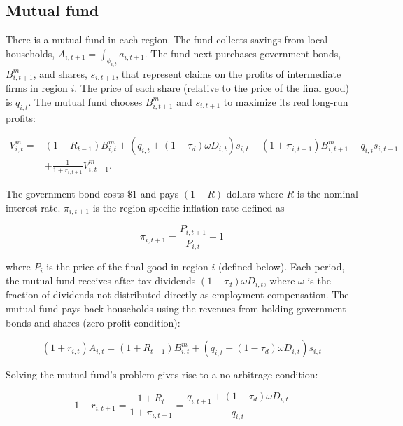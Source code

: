 \documentclass[\latexroot/\projectname]{subfiles}
\begin{document}
\subsection{Mutual fund}
There is a mutual fund in each region. The fund collects savings from local households, $A_{i, t+1}= \int_{\phi_{i, t}} a_{i, t+1}$. The fund next purchases government bonds, $B_{i, t+1}^{m}$, and shares, $s_{i, t+1}$, that represent claims on the profits of intermediate firms in region $i$. The price of each share (relative to the price of the final good) is $q_{i, t}$. The mutual fund chooses $B_{i, t+1}^{m}$ and $s_{i, t+1}$ to maximize its real long-run profits:


\begin{align*}
V_{i, t}^{m}= & \left(1+R_{t-1}\right) B_{i, t}^{m}+\left(q_{i, t}+\left(1-\tau_{d}\right) \omega D_{i, t}\right) s_{i, t}-\left(1+\pi_{i, t+1}\right) B_{i, t+1}^{m}-q_{i, t} s_{i, t+1} \\
& +\frac{1}{1+r_{i, t+1}} V_{i, t+1}^{m} . \tag{4.6}
\end{align*}


The government bond costs $\$ 1$ and pays $(1+R)$ dollars where $R$ is the nominal interest rate. $\pi_{i, t+1}$ is the region-specific inflation rate defined as


\begin{equation*}
\pi_{i, t+1}=\frac{P_{i, t+1}}{P_{i, t}}-1 \tag{4.7}
\end{equation*}


where $P_{i}$ is the price of the final good in region $i$ (defined below). Each period, the mutual fund receives after-tax dividends $\left(1-\tau_{d}\right) \omega D_{i, t}$, where $\omega$ is the fraction of dividends not distributed directly as employment compensation. The mutual fund pays back households using the revenues from holding government bonds and shares (zero profit condition):


\begin{equation*}
\left(1+r_{i, t}\right) A_{i, t}=\left(1+R_{t-1}\right) B_{i, t}^{m}+\left(q_{i, t}+\left(1-\tau_{d}\right) \omega D_{i, t}\right) s_{i, t} \tag{4.8}
\end{equation*}


Solving the mutual fund's problem gives rise to a no-arbitrage condition:


\begin{equation*}
1+r_{i, t+1}=\frac{1+R_{t}}{1+\pi_{i, t+1}}=\frac{q_{i, t+1}+\left(1-\tau_{d}\right) \omega D_{i, t}}{q_{i, t}} \tag{4.9}
\end{equation*}
\end{document}
